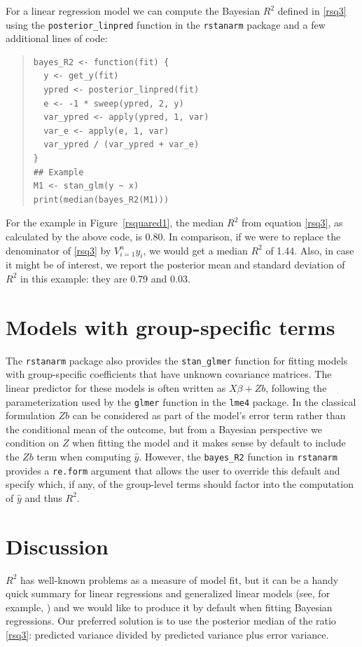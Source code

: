 \documentclass[11pt]{article}
\begin{document}
For a linear regression model we can compute the Bayesian $R^2$ defined in
\eqref{rsq3} using the \verb#posterior_linpred# function in the {\tt rstanarm}
package \citep{rstanarmRpackage} and a few additional lines of code:
%
\vspace{-\baselineskip}
\begin{quotation}
\noindent
\begin{small}
\begin{verbatim}
bayes_R2 <- function(fit) {
  y <- get_y(fit)
  ypred <- posterior_linpred(fit)
  e <- -1 * sweep(ypred, 2, y)
  var_ypred <- apply(ypred, 1, var)
  var_e <- apply(e, 1, var)
  var_ypred / (var_ypred + var_e)
}
## Example
M1 <- stan_glm(y ~ x)
print(median(bayes_R2(M1)))
\end{verbatim}
\end{small}
\end{quotation}
%
For the example in Figure~\ref{rsquared1}, the median $R^2$ from
equation \eqref{rsq3}, as calculated by the above code, is 0.80.  In comparison,
if we were to replace the denominator of \eqref{rsq3} by $V_{i=1}^n y_i$, we
would get a median $R^2$ of 1.44.  Also, in case it might be of interest, we
report the posterior mean and standard deviation of $R^2$ in this example:
they are 0.79 and 0.03.

\section{Models with group-specific terms}
The {\tt rstanarm} package also provides the \verb#stan_glmer# function for 
fitting models with group-specific coefficients that have unknown covariance matrices.
The linear predictor for these models is often written as $X \beta + Zb$, following
the parameterization used by the \verb#glmer# function in the {\tt lme4} package.
In the classical formulation $Zb$ can be considered as part of the model's error term
rather than the conditional mean of the outcome, but from a Bayesian perspective we 
condition on $Z$ when fitting the model and it makes sense by default to include the $Zb$ 
term when computing $\hat{y}$. However, the \verb#bayes_R2# function in {\tt rstanarm} 
provides a {\tt re.form} argument that allows the user to override this default and specify which, 
if any, of the group-level terms should factor into the computation of $\hat{y}$ and thus $R^2$.

\section{Discussion}
$R^2$ has well-known problems as a measure of model fit, but it can be a handy
quick summary for linear regressions and generalized linear models (see, for
example, \cite{HuPaltaShao2006}) and we would like to produce it by default
when fitting Bayesian regressions.  Our preferred solution is to use the
posterior median of the ratio \eqref{rsq3}:  predicted variance divided by
predicted variance plus error variance.
\end{document}
